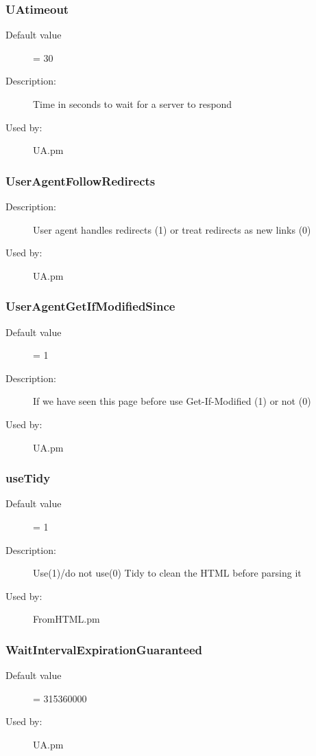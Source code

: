 \subsubsection{UAtimeout}
\label{UAtimeout}
\begin{description}
\item[Default value] = 30
\item[Description:] Time in seconds to wait for a server to respond
\item[Used by:] UA.pm
\end{description}
\subsubsection{UserAgentFollowRedirects}
\label{UserAgentFollowRedirects}
\begin{description}
\item[Description:] User agent handles redirects (1) or treat redirects as new links (0)
\item[Used by:] UA.pm
\end{description}
\subsubsection{UserAgentGetIfModifiedSince}
\label{UserAgentGetIfModifiedSince}
\begin{description}
\item[Default value] = 1
\item[Description:] If we have seen this page before use Get-If-Modified (1) or not (0)
\item[Used by:] UA.pm
\end{description}
\subsubsection{useTidy}
\label{useTidy}
\begin{description}
\item[Default value] = 1
\item[Description:] Use(1)/do not use(0) Tidy to clean the HTML before parsing it
\item[Used by:] FromHTML.pm
\end{description}
\subsubsection{WaitIntervalExpirationGuaranteed}
\label{WaitIntervalExpirationGuaranteed}
\begin{description}
\item[Default value] = 315360000
\item[Used by:] UA.pm
\end{description}
